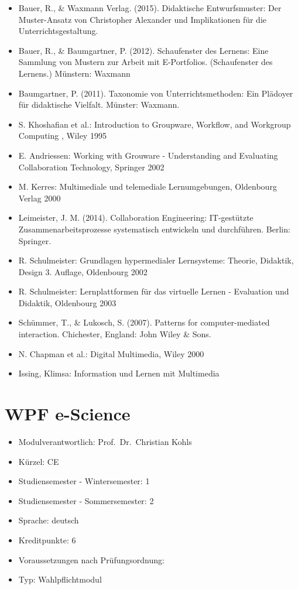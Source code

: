 \begin{itemize}
\tightlist
\item
  Bauer, R., \& Waxmann Verlag. (2015). Didaktische Entwurfsmuster: Der
  Muster-Ansatz von Christopher Alexander und Implikationen für die
  Unterrichtsgestaltung.
\item
  Bauer, R., \& Baumgartner, P. (2012). Schaufenster des Lernens: Eine
  Sammlung von Mustern zur Arbeit mit E-Portfolios. (Schaufenster des
  Lernens.) Münstern: Waxmann
\item
  Baumgartner, P. (2011). Taxonomie von Unterrichtsmethoden: Ein
  Plädoyer für didaktische Vielfalt. Münster: Waxmann.
\item
  S. Khoshafian et al.: Introduction to Groupware, Workflow, and
  Workgroup Computing , Wiley 1995
\item
  E. Andriessen: Working with Grouware - Understanding and Evaluating
  Collaboration Technology, Springer 2002
\item
  M. Kerres: Multimediale und telemediale Lernumgebungen, Oldenbourg
  Verlag 2000
\item
  Leimeister, J. M. (2014). Collaboration Engineering: IT-gestützte
  Zusammenarbeitsprozesse systematisch entwickeln und durchführen.
  Berlin: Springer.
\item
  R. Schulmeister: Grundlagen hypermedialer Lernsysteme: Theorie,
  Didaktik, Design 3. Auflage, Oldenbourg 2002
\item
  R. Schulmeister: Lernplattformen für das virtuelle Lernen - Evaluation
  und Didaktik, Oldenbourg 2003
\item
  Schümmer, T., \& Lukosch, S. (2007). Patterns for computer-mediated
  interaction. Chichester, England: John Wiley \& Sons.
\item
  N. Chapman et al.: Digital Multimedia, Wiley 2000
\item
  Issing, Klimsa: Information und Lernen mit Multimedia
\end{itemize}

\chapter{WPF e-Science}\label{wpf-e-science}

\begin{itemize}
\tightlist
\item
  Modulverantwortlich: Prof.~Dr.~Christian Kohls
\item
  Kürzel: CE
\item
  Studiensemester - Wintersemester: 1
\item
  Studiensemester - Sommersemester: 2
\item
  Sprache: deutsch
\item
  Kreditpunkte: 6
\item
  Voraussetzungen nach Prüfungsordnung:
\item
  Typ: Wahlpflichtmodul
\end{itemize}

